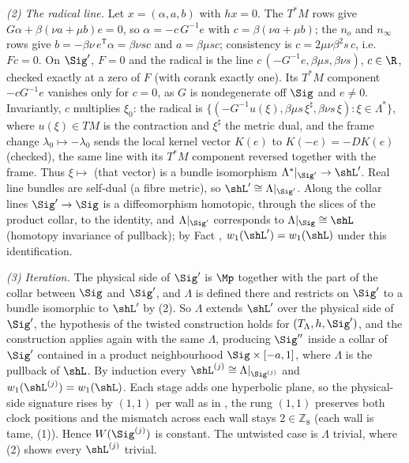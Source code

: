 \emph{(2) The radical line.} Let $x = (\alpha, a, b)$ with $h x = 0$. The $T^*M$ rows give $G\alpha + \beta(\nu a + \mu b)e = 0$, so $\alpha = -c\,G^{-1}e$ with $c = \beta(\nu a + \mu b)$; the $n_o$ and $n_\infty$ rows give $b = -\beta\nu\,e^{\mathsf T}\alpha = \beta\nu s c$ and $a = \beta\mu s c$; consistency is $c = 2\mu\nu\beta^2 s\,c$, i.e.\ $F c = 0$. On $\Sig'$, $F = 0$ and the radical is the line $c\,(-G^{-1}e, \beta\mu s, \beta\nu s)$, $c \in \R$, checked exactly at a zero of $F$ (with corank exactly one). Its $T^*M$ component $-cG^{-1}e$ vanishes only for $c = 0$, as $G$ is nondegenerate off $\Sig$ and $e \neq 0$. Invariantly, $c$ multiplies $\xi_0$: the radical is $\{(-G^{-1}u(\xi), \beta\mu s\,\xi^\sharp, \beta\nu s\,\xi) : \xi \in \Lambda^*\}$, where $u(\xi) \in TM$ is the contraction and $\xi^\sharp$ the metric dual, and the frame change $\lambda_0 \mapsto -\lambda_0$ sends the local kernel vector $K(e)$ to $K(-e) = -DK(e)$ (checked), the same line with its $T^*M$ component reversed together with the frame. Thus $\xi \mapsto$ (that vector) is a bundle isomorphism $\Lambda^*|_{\Sig'} \to \shL'$. Real line bundles are self-dual (a fibre metric), so $\shL' \cong \Lambda|_{\Sig'}$. Along the collar lines $\Sig' \to \Sig$ is a diffeomorphism homotopic, through the slices of the product collar, to the identity, and $\Lambda|_{\Sig'}$ corresponds to $\Lambda|_\Sig \cong \shL$ (homotopy invariance of pullback); by Fact , $w_1(\shL') = w_1(\shL)$ under this identification.

\emph{(3) Iteration.} The physical side of $\Sig'$ is $\Mp$ together with the part of the collar between $\Sig$ and $\Sig'$, and $\Lambda$ is defined there and restricts on $\Sig'$ to a bundle isomorphic to $\shL'$ by (2). So $\Lambda$ extends $\shL'$ over the physical side of $\Sig'$, the hypothesis of the twisted construction holds for $(T_\Lambda, h, \Sig')$, and the construction applies again with the same $\Lambda$, producing $\Sig''$ inside a collar of $\Sig'$ contained in a product neighbourhood $\Sig \times [-a, 1]$, where $\Lambda$ is the pullback of $\shL$. By induction every $\shL^{(j)} \cong \Lambda|_{\Sig^{(j)}}$ and $w_1(\shL^{(j)}) = w_1(\shL)$. Each stage adds one hyperbolic plane, so the physical-side signature rises by $(1,1)$ per wall as in , the rung $(1,1)$ preserves both clock positions and the mismatch across each wall stays $2 \in \mathbb{Z}_8$ (each wall is tame, (1)). Hence $W(\Sig^{(j)})$ is constant. The untwisted case is $\Lambda$ trivial, where (2) shows every $\shL^{(j)}$ trivial.

